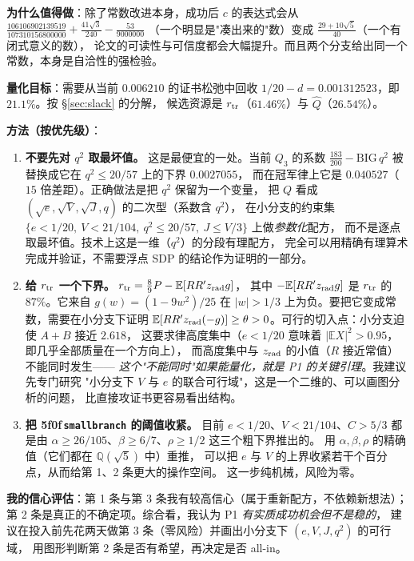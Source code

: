 \documentclass[UTF8,11pt]{ctexart}
\theoremstyle{definition}
\newcommand{\E}{\mathbb{E}}
\newcommand{\peq}[1]{\textup{\u5f0f}\,\texttt{#1}}
\begin{document}
\textbf{为什么值得做}：除了常数改进本身，成功后 $c$ 的表达式会从
$\frac{106106902139519}{107310156800000}+\frac{41\sqrt3}{240}-\frac{53}{9000000}$
（一个明显是"凑出来的"数）变成 $\frac{29+10\sqrt5}{40}$（一个有闭式意义的数），
论文的可读性与可信度都会大幅提升。而且两个分支给出同一个常数，本身是自洽性的强检验。

\textbf{量化目标}：需要从当前 $0.006210$ 的证书松弛中回收
$1/20-d=0.001312523$，即 $21.1\%$。按 \S\ref{sec:slack} 的分解，
候选资源是 $r_{\rm tr}$（$61.46\%$）与 $\widehat Q$（$26.54\%$）。

\textbf{方法（按优先级）}：
\begin{enumerate}[leftmargin=1.8em,itemsep=3pt]
\item \textbf{不要先对 $q^2$ 取最坏值。} 这是最便宜的一处。当前 $Q_3$ 的系数
$\frac{183}{200}-\mathrm{BIG}\,q^2$ 被替换成它在 $q^2\le20/57$ 上的下界 $0.0027055$，
而在冠军律上它是 $0.040527$（$15$ 倍差距）。正确做法是把 $q^2$ 保留为一个变量，
把 $Q$ 看成 $(\sqrt e,\sqrt V,\sqrt J,q)$ 的二次型（系数含 $q^2$），
在小分支的约束集 $\{e<1/20,\ V<21/104,\ q^2\le20/57,\ J\le V/3\}$ 上做\emph{参数化}配方，
而不是逐点取最坏值。技术上这是一维（$q^2$）的分段有理配方，
完全可以用精确有理算术完成并验证，不需要浮点 SDP 的结论作为证明的一部分。
\item \textbf{给 $r_{\rm tr}$ 一个下界。} $r_{\rm tr}=\frac89P-\E[RR'z_{\rm rad}g]$，
其中 $-\E[RR'z_{\rm rad}g]$ 是 $r_{\rm tr}$ 的 $87\%$。它来自 $g(w)=(1-9w^2)/25$ 在
$|w|>1/3$ 上为负。要把它变成常数，需要在小分支下证明
$\E[RR'z_{\rm rad}(-g)]\ge\theta>0$。可行的切入点：小分支迫使 $A+B$ 接近 $2.618$，
这要求律高度集中（$e<1/20$ 意味着 $|\E X|^2>0.95$，即几乎全部质量在一个方向上），
而高度集中与 $z_{\rm rad}$ 的小值（$R$ 接近常值）不能同时发生——
\emph{这个"不能同时"如果能量化，就是 P1 的关键引理}。我建议先专门研究
"小分支下 $V$ 与 $e$ 的联合可行域"，这是一个二维的、可以画图分析的问题，
比直接攻证书更容易看出结构。
\item \textbf{把 \peq{smallbranch} 的阈值收紧。} 目前 $e<1/20$、$V<21/104$、$C>5/3$
都是由 $\alpha\ge26/105$、$\beta\ge6/7$、$\rho\ge1/2$ 这三个粗下界推出的。
用 $\alpha,\beta,\rho$ 的精确值（它们都在 $\mathbb Q(\sqrt5)$ 中）重推，
可以把 $e$ 与 $V$ 的上界收紧若干个百分点，从而给第 1、2 条更大的操作空间。
这一步纯机械，风险为零。
\end{enumerate}

\textbf{我的信心评估}：第 1 条与第 3 条我有较高信心（属于重新配方，不依赖新想法）；
第 2 条是真正的不确定项。综合看，我认为 P1 \emph{有实质成功机会但不是稳的}，
建议在投入前先花两天做第 3 条（零风险）并画出小分支下 $(e,V,J,q^2)$ 的可行域，
用图形判断第 2 条是否有希望，再决定是否 all-in。
\end{document}
